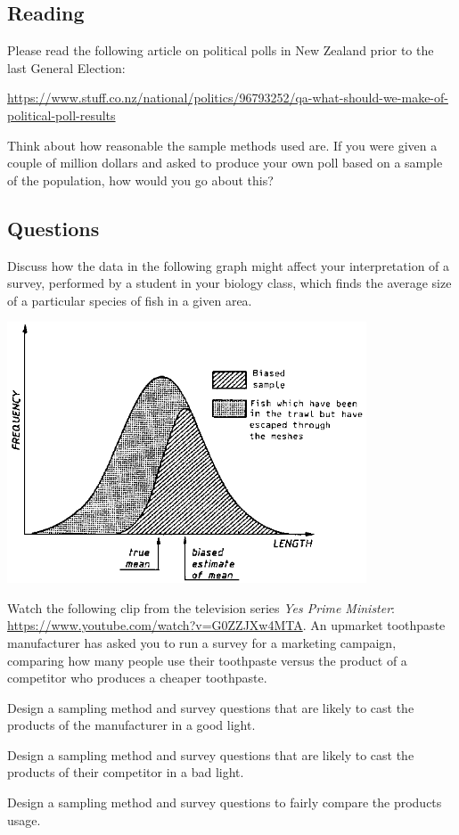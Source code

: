 



\subsection*{Reading}
Please read the following article on political polls in New Zealand prior to the last General Election:
\begin{center}
  \url{https://www.stuff.co.nz/national/politics/96793252/qa-what-should-we-make-of-political-poll-results}
\end{center}
Think about how reasonable the sample methods used are. If you were given a couple of million dollars and asked to produce
your own poll based on a sample of the population, how would you go about this?

\subsection*{Questions}
\begin{questions}
  \question Discuss how the data in the following graph might affect your interpretation of a survey, performed by a student in your biology class,
            which finds the average size of a particular species of fish in a given area.
            \begin{center}
              \includegraphics[width=0.8\textwidth]{badsample}
            \end{center}
  \question Watch the following clip from the television series \emph{Yes Prime Minister}: \url{https://www.youtube.com/watch?v=G0ZZJXw4MTA}.
            An upmarket toothpaste manufacturer has asked you to run a survey for a marketing campaign, comparing how many people use their
            toothpaste versus the product of a competitor who produces a cheaper toothpaste.
    \begin{parts}
      \item Design a sampling method and survey questions that are likely to cast the products of the manufacturer in a good light.
      \item Design a sampling method and survey questions that are likely to cast the products of their competitor in a bad light.
      \item Design a sampling method and survey questions to fairly compare the products usage.
    \end{parts}
\end{questions}

